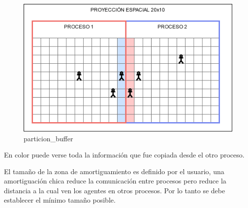 \begin{figure}
	\centering
	\includegraphics{process_02.png}
	\caption{particion\_buffer}
\end{figure}

En color puede verse toda la información que fue copiada desde el otro
proceso.

El tamaño de la zona de amortiguamiento es definido por el usuario, una
amortiguación chica reduce la comunicación entre procesos pero reduce la
distancia a la cual ven los agentes en otros procesos. Por lo tanto se
debe establecer el mínimo tamaño posible.
